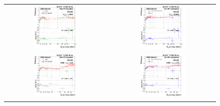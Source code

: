 \begin{figure}[bh]
  \begin{center}
    \begin{tabular}{cc}
      \includegraphics[width=0.45\textwidth]{figures/Zprime/2016/ScaleFactor/SameSign/DY_amcatnlo_check/g_compare_cut_Et_Barrel_ea_ta_inc_AS_nominal_PUW.png} &
      \includegraphics[width=0.45\textwidth]{figures/Zprime/2016/ScaleFactor/SameSign/DY_amcatnlo_check/g_compare_cut_Et_Barrel_ea_ta_exc_AS_nominal_PUW.png} \\
      \includegraphics[width=0.45\textwidth]{figures/Zprime/2016/ScaleFactor/SameSign/DY_amcatnlo_check/g_compare_cut_Et_Endcap_ea_ta_inc_AS_nominal_PUW.png} &
      \includegraphics[width=0.45\textwidth]{figures/Zprime/2016/ScaleFactor/SameSign/DY_amcatnlo_check/g_compare_cut_Et_Endcap_ea_ta_exc_AS_nominal_PUW.png}

\end{tabular}
\end{center}
\end{figure}
